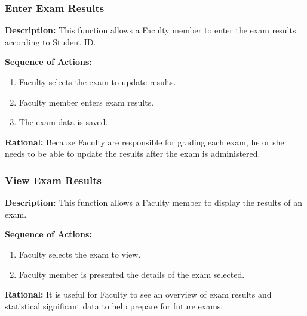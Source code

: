    \subsubsection{\large Enter Exam Results} 
   \begin{boxed} %
      \textbf{Description:}
      This function allows a Faculty member to enter the exam results
         according to Student ID.
         
         \vspace{3mm}
         \textbf{Sequence of Actions:}
         \begin{enumerate}
               
            \item Faculty selects the exam to update results.
            \item Faculty member enters exam results.
            \item The exam data is saved. 
         \end{enumerate}

         \textbf{Rational:}
         Because Faculty are responsible for grading each exam, he or she needs
         to be able to update the results after the exam is administered.
   \end{boxed} %

   \subsubsection{\large View Exam Results} 
   \begin{boxed} %
      \textbf{Description:}
      This function allows a Faculty member to display the results of an
         exam.
         
         \vspace{3mm}
         \textbf{Sequence of Actions:}
         \begin{enumerate}
               
            \item Faculty selects the exam to view.
            \item Faculty member is presented the details of the exam selected.
         \end{enumerate}

         \textbf{Rational:}
         It is useful for Faculty to see an overview of exam results and
         statistical significant data to help prepare for future exams.
   \end{boxed} %

